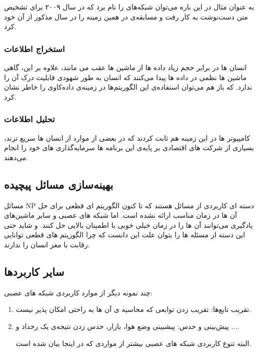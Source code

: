 \documentclass[11pt,a4paper,twocolumn]{article}
\begin{document}
به عنوان مثال در این باره می‌توان شبکه‌های  را نام برد که در سال ۲۰۰۹ برای تشخیص متن دست‌نوشت به کار رفت و مسابقه‌ی  در همین زمینه را در سال مذکور از آن خود کرد.
\subsubsection{استخراج اطلاعات}
انسان ها در برابر حجم زیاد داده ها از ماشین ها عقب می مانند، علاوه بر این، گاهی ماشین ها نظمی در داده ها پیدا می‌کنند که انسان به طور شهودی قابلیت درک آن را ندارد. که باز هم می‌توان استفاده‌ی این الگوریتم‌ها در زمینه‌ی داده‌کاوی را خاطر نشان کرد.
\subsubsection{تحلیل اطلاعات}
 کامپیوتر ها در این زمینه هم ثابت کردند که در بعضی از موارد از انسان ها سریع ترند، بسیاری از شرکت های اقتصادی بر پایه‌ی این برنامه ها سرمایه‌گذاری های خود را انجام می‌دهند.
\subsection{بهینه‌سازی مسائل پیچیده}
مسائل NP دسته ای کاربردی از مسائل هستند که تا کنون الگوریتم ای قطعی برای حل آن ها در زمان مناسب ارائه نشده است. اما شبکه های عصبی و سایر ماشین‌های یادگیری می‌توانند آن ها را در زمان خیلی خوبی با اطمینان بالایی حل کنند. و شاید حتی این دسته از مسئله ها را بتوان علت این دانست که چرا الگوریتم های قطعی توانایی رقابت با مغز انسان را ندارند.
\subsection{سایر کاربردها}
چند نمونه دیگر از  موارد کاربردی شبکه های عصبی:
\begin{enumerate}
\item
تقریب تابع‌ها:
تقریب زدن توابعی که محاسبه ی آن ها به راحتی امکان پذیر نیست.
\item
پیش‌بینی و حدس:
پیشبینی وضع هوا، بازار، حدس زدن نتیجه‌ی یک رخداد و ....

البته تنوع کاربردی شبکه های عصبی بیشتر از مواردی که در اینجا بیان شده است.

\end{enumerate}
\end{document}
